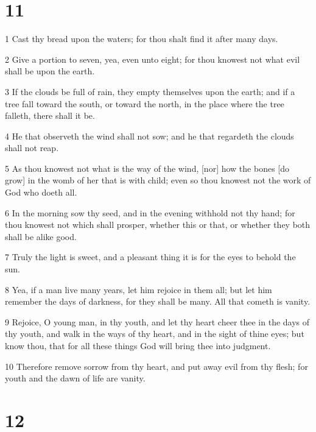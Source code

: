 \chapter{11}

\par 1 Cast thy bread upon the waters; for thou shalt find it after many days.
\par 2 Give a portion to seven, yea, even unto eight; for thou knowest not what evil shall be upon the earth.
\par 3 If the clouds be full of rain, they empty themselves upon the earth; and if a tree fall toward the south, or toward the north, in the place where the tree falleth, there shall it be.
\par 4 He that observeth the wind shall not sow; and he that regardeth the clouds shall not reap.
\par 5 As thou knowest not what is the way of the wind, [nor] how the bones [do grow] in the womb of her that is with child; even so thou knowest not the work of God who doeth all.
\par 6 In the morning sow thy seed, and in the evening withhold not thy hand; for thou knowest not which shall prosper, whether this or that, or whether they both shall be alike good.
\par 7 Truly the light is sweet, and a pleasant thing it is for the eyes to behold the sun.
\par 8 Yea, if a man live many years, let him rejoice in them all; but let him remember the days of darkness, for they shall be many. All that cometh is vanity.
\par 9 Rejoice, O young man, in thy youth, and let thy heart cheer thee in the days of thy youth, and walk in the ways of thy heart, and in the sight of thine eyes; but know thou, that for all these things God will bring thee into judgment.
\par 10 Therefore remove sorrow from thy heart, and put away evil from thy flesh; for youth and the dawn of life are vanity.

\chapter{12}

